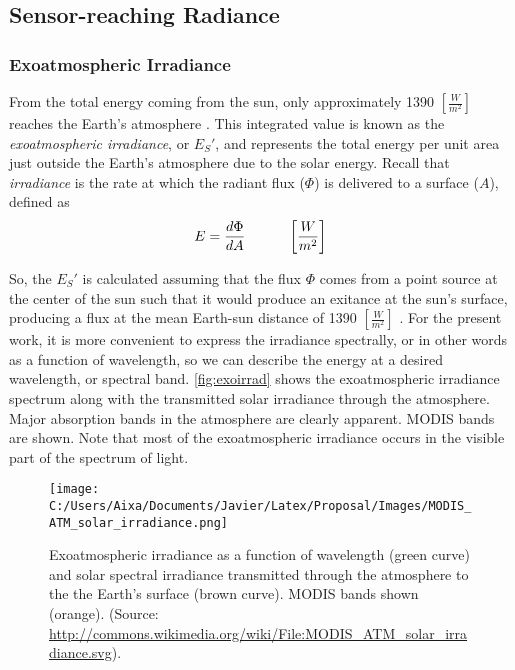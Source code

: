\subsection{Sensor-reaching Radiance}

\subsubsection{Exoatmospheric Irradiance}

From the total energy coming from the sun, only approximately 1390 $\left[\frac{W}{m^2}\right]$ reaches the Earth's atmosphere \cite{Schott}. This integrated value is known as the \emph{exoatmospheric irradiance}, or $E_S'$, and represents the total energy per unit area just outside the Earth's atmosphere due to the solar energy. Recall that \emph{irradiance} is the rate at which the radiant flux ($\Phi$) is delivered to a surface ($A$), defined as
\begin{equation} \label{eq:irradiance}
E = \frac{d\Phi}{dA}   \indent   \indent  \left[\frac{W}{m^2}\right]  
\end{equation} 

So, the $E_S'$ is calculated assuming that the flux $\Phi$ comes from a point source at the center of the sun such that it would produce an exitance at the sun's surface, producing a flux at the mean Earth-sun distance of 1390 $\left[\frac{W}{m^2}\right]$ . For the present work, it is more convenient to express the irradiance spectrally, or in other words as a function of wavelength, so we can describe the energy at a desired wavelength, or spectral band. \autoref{fig:exoirrad} shows the exoatmospheric irradiance spectrum  along with the transmitted solar irradiance through the atmosphere. Major absorption bands in the atmosphere are clearly apparent. MODIS bands are shown. Note that most of the exoatmospheric irradiance occurs in the visible part of the spectrum of light.

\begin{figure}[htb]
  \centering
  \texttt{[image: C:/Users/Aixa/Documents/Javier/Latex/Proposal/Images/MODIS\_ATM\_solar\_irradiance.png]}
\caption{Exoatmospheric irradiance as a function of wavelength (green curve) and solar spectral irradiance transmitted through the  atmosphere to the the Earth's surface (brown curve). MODIS bands shown (orange).  (Source: \protect\url{http://commons.wikimedia.org/wiki/File:MODIS_ATM_solar_irradiance.svg}).}
\label{fig:exoirrad} 
\end{figure}

